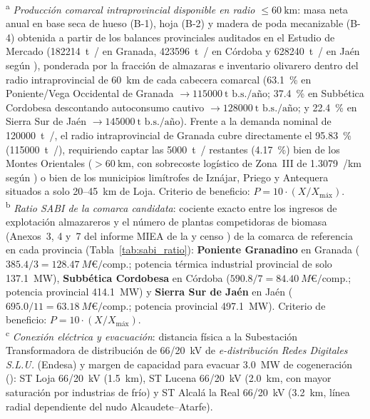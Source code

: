 \documentclass{report}
\begin{document}
\begin{table}[H]
{    \textsuperscript{a} \textit{Producción comarcal intraprovincial disponible en radio $\le \SI{60}{\kilo\metre}$}: masa neta anual en base seca de hueso (B-1), hoja (B-2) y madera de poda mecanizable (B-4) obtenida a partir de los balances provinciales auditados en el Estudio de Mercado (\SI{182214}{\tonne{}/} en Granada, \SI{423596}{\tonne{}/} en Córdoba y \SI{628240}{\tonne{}/} en Jaén según \textcite{AICA2026, MAPA2025, CAP2008}), ponderada por la fracción de almazaras e inventario olivarero dentro del radio intraprovincial de \SI{60}{\kilo\metre} de cada cabecera comarcal (\SI{63.1}{\percent} en Poniente/Vega Occidental de Granada $\to \SI{115000}{\tonne\text{ b.s.}/\text{año}}$; \SI{37.4}{\percent} en Subbética Cordobesa descontando autoconsumo cautivo $\to \SI{128000}{\tonne\text{ b.s.}/\text{año}}$; y \SI{22.4}{\percent} en Sierra Sur de Jaén $\to \SI{145000}{\tonne\text{ b.s.}/\text{año}}$). Frente a la demanda nominal de \SI{120000}{\tonne{}/}, el radio intraprovincial de Granada cubre directamente el \SI{95.83}{\percent} (\SI{115000}{\tonne{}/}), requiriendo captar las \SI{5000}{\tonne{}/} restantes (\SI{4.17}{\percent}) bien de los Montes Orientales ($>\SI{60}{\kilo\metre}$, con sobrecoste logístico de Zona~III de \SI{1.3079}{/\kilo\metre} según \textcite{Ronda2027}) o bien de los municipios limítrofes de Iznájar, Priego y Antequera situados a solo \num{20}--\SI{45}{\kilo\metre} de Loja. Criterio de beneficio: $P = 10 \cdot (X / X_{\text{máx}})$.\\
    \textsuperscript{b} \textit{Ratio SABI de la comarca candidata}: cociente exacto entre los ingresos de explotación almazareros y el número de plantas competidoras de biomasa (Anexos~3, 4 y~7 del informe MIEA de la \textcite{AAE2026} y censo \textcite{AVEBIOM2026}) de la comarca de referencia en cada provincia (Tabla~\ref{tab:sabi_ratio}): \textbf{Poniente Granadino} en Granada ($\num{385.4} / 3 = \SI{128.47}{M\text{€}/\text{comp.}}$; potencia térmica industrial provincial de solo \SI{137.1}{\mega\watt}), \textbf{Subbética Cordobesa} en Córdoba ($\num{590.8} / 7 = \SI{84.40}{M\text{€}/\text{comp.}}$; potencia provincial \SI{414.1}{\mega\watt}) y \textbf{Sierra Sur de Jaén} en Jaén ($\num{695.0} / 11 = \SI{63.18}{M\text{€}/\text{comp.}}$; potencia provincial \SI{497.1}{\mega\watt}). Criterio de beneficio: $P = 10 \cdot (X / X_{\text{máx}})$.\\
    \textsuperscript{c} \textit{Conexión eléctrica y evacuación}: distancia física a la Subestación Transformadora de distribución de 66/20~kV de \textit{e-distribución Redes Digitales S.L.U.} (Endesa) y margen de capacidad para evacuar \SI{3.0}{\mega\watt} de cogeneración (\textcite{AAE2026}): ST Loja 66/20~kV (\SI{1.5}{\kilo\metre}), ST Lucena 66/20~kV (\SI{2.0}{\kilo\metre}, con mayor saturación por industrias de frío) y ST Alcalá la Real 66/20~kV (\SI{3.2}{\kilo\metre}, línea radial dependiente del nudo Alcaudete--Atarfe).\\
}
\end{table}
\end{document}
